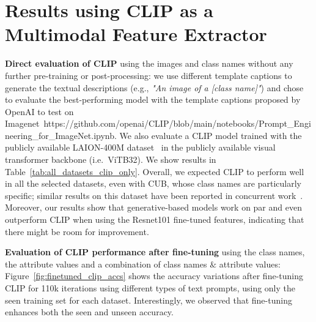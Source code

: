 \section{Results using CLIP as a Multimodal Feature Extractor} 
\label{sec:results_multimodal}
\textbf{Direct evaluation of CLIP} using the images and class names without any further pre-training or post-processing: we use different template captions to generate the textual descriptions (e.g., \textit{"An image of a [class name]"}) and chose to evaluate the best-performing model with the template captions proposed by OpenAI to test on Imagenet~https://github.com/openai/CLIP/blob/main/notebooks/Prompt_Engineering_for_ImageNet.ipynb.
We also evaluate a CLIP model trained with the publicly available LAION-400M dataset~\cite{LAION400M} in the publicly available visual transformer backbone (i.e.~ViTB32). We show results in Table~\ref{tab:all_datasets_clip_only}. Overall, we expected CLIP to perform well in all the selected datasets, even with CUB, whose class names are particularly specific; similar results on this dataset have been reported in concurrent work~\cite{Vogel2022VLTabooAA}. Moreover, our results show that generative-based models work on par and even outperform CLIP when using the Resnet101 fine-tuned features, indicating that there might be room for improvement. 


\textbf{Evaluation of CLIP performance after fine-tuning} using the class
names, the attribute values and a combination of class names
$\&$ attribute values: Figure~\ref{fig:finetuned_clip_accs} shows the accuracy
variations after fine-tuning CLIP for 110k iterations using different types of text prompts, using only the seen training set for each dataset. Interestingly, we observed that fine-tuning enhances both the seen and unseen accuracy.

